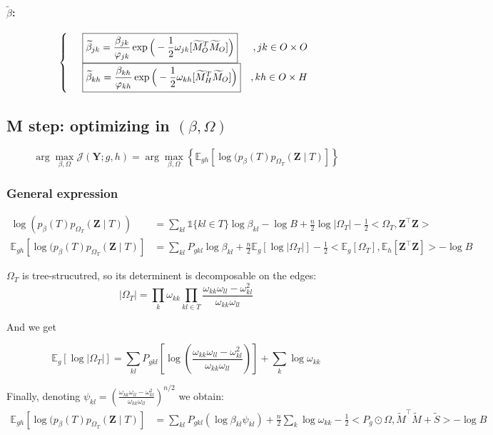 \documentclass[11pt,a4paper]{article}
\newcommand{\argmax}{\arg\!\max}
\newcommand{\Ybf}{\boldsymbol{Y}}
\newcommand{\Zbf}{\boldsymbol{Z}}
\newcommand{\Esp}{\mathds{E}}
\begin{document}
\paragraph{$\widetilde{\beta}$:}

\[\left\{\begin{array}{ll r}
&\boxed{\widetilde{\beta}_{jk} =\frac{\beta_{jk}}{\varphi_{jk}}\exp\Big(-\frac{1}{2} \omega_{jk}[\widetilde{M}_O^T \widetilde{M}_O]\Big) }& ,jk \in O\times O\\
&\boxed{\widetilde{\beta}_{kh} =\frac{\beta_{kh}}{\varphi_{kh}}\exp\Big(-\frac{1}{2} \omega_{kh}[\widetilde{M}_H^T \widetilde{M}_O]\Big) }& ,kh \in O\times H
\end{array}\right.\]

\subsection{M step: optimizing in $(\beta, \Omega)$}
 
$$ \argmax_{\beta, \Omega} \mathcal{J}(\Ybf ; g,h) =\argmax_{\beta, \Omega} \left\{ \Esp_{gh} [\log (p_\beta(T)p_{\Omega_T}(\Zbf\mid T) ]\right\} $$

\subsubsection{General expression}
\begin{align*}
\log (p_\beta(T)p_{\Omega_T}(\Zbf\mid T))  &= \sum_{kl} \mathds{1}\{kl \in T\} \log \beta_{kl} - \log B + \frac{n}{2}\log |\Omega_T| - \frac{1}{2}<\Omega_T,\Zbf^\intercal \Zbf>\\
\Esp_{gh} [\log (p_\beta(T)p_{\Omega_T}(\Zbf\mid T) ] &= \sum_{kl} P_{gkl} \log\beta_{kl} +\frac{n}{2} \Esp_g[\log |\Omega_T|] -\frac{1}{2} <\Esp_g [\Omega_T], \Esp_h[\Zbf^\intercal \Zbf]>- \log B
\end{align*}

$\Omega_T$ is tree-strucutred, so its determinent is decomposable on the edges:
$$|\Omega_{T}| = \prod_{k} \omega_{kk} \prod_{kl \in T} \frac{\omega_{kk}\omega_{ll}-\omega_{kl}^2}{\omega_{kk}\omega_{ll}}$$

And we get

$$\Esp_g[\log |\Omega_{T}|]= \sum _{kl} P_{gkl} \left[ \log\left(\frac{\omega_{kk}\omega_{ll}-\omega_{kl}^2}{\omega_{kk}\omega_{ll}}\right)\right] + \sum_k \log \omega_{kk}$$

Finally, denoting $\psi_{kl} = \left(\frac{\omega_{kk}\omega_{ll}-\omega_{kl}^2}{\omega_{kk}\omega_{ll}}\right)^{n/2}$ we obtain:
\begin{align*}
\Esp_{gh} [\log (p_\beta(T)p_{\Omega_T}(\Zbf\mid T) ] &=\sum_{kl} P_{gkl} \left(\log  \beta_{kl}\psi_{kl}\right) + \frac{n}{2}\sum_k \log \omega_{kk} - \frac{1}{2}<P_g \odot \Omega, \widetilde{M}^\intercal \widetilde{M} + \widetilde{S}>- \log B
\end{align*}
 
\end{document}
